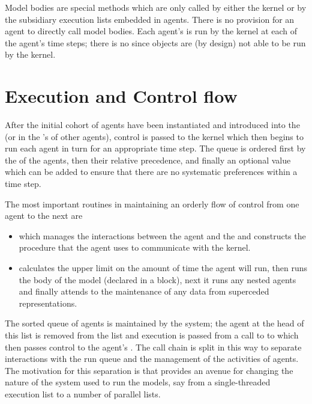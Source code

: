 Model bodies are special methods which are only called by either the
kernel or by the subsidiary execution lists embedded in agents. There
is no provision for an agent to directly call model bodies.  Each
agent's  is run by the kernel at each of the
agent's time steps; there is no  since objects are
(by design) not able to be run by the kernel.

\section{Execution and Control flow}

After the initial cohort of agents have been instantiated and
introduced into the  (or in the
's of other agents), control is passed to
the kernel which then begins to run each agent in turn for an
appropriate time step. The queue is ordered first by the
 of the agents, then their relative precedence, and
finally an optional  value which can be added to ensure that
there are no systematic preferences within a time step.

The most important routines in maintaining an orderly flow of control
from one agent to the next are
\begin{itemize}
\item[\method{run-agent}] which manages the interactions between the
agent and the  and constructs the procedure that the agent uses
to communicate with the kernel.

\item[\method{run}] calculates the upper limit on the amount of time the
agent will run, then runs the body of the model (declared in
a  block), next it runs any nested agents and
finally attends to the maintenance of any data from superceded
representations.
\end{itemize}

The sorted queue of agents is maintained by the system; the agent at
the head of this list is removed from the list and execution is passed
from a call to  to   which then passes
control to the agent's . The call chain is split in
this way to separate interactions with the run queue and the
management of the activities of agents.  The motivation for this
separation is that provides an avenue for changing the nature of the
system used to run the models, say from a single-threaded execution
list to a number of parallel lists.

